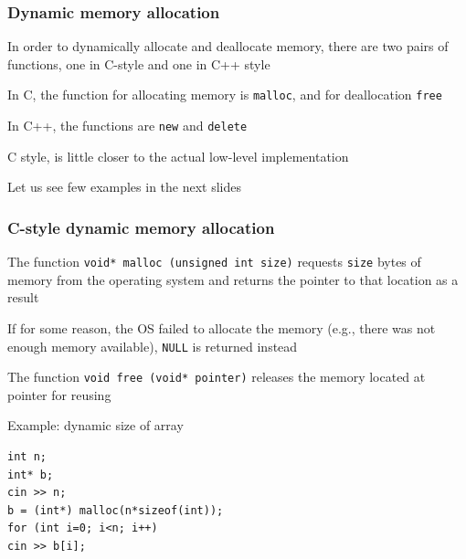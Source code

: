 \documentclass{beamer}
\begin{document}
\begin{frame}[fragile]
\frametitle{Dynamic memory allocation}
In order to dynamically allocate and deallocate memory, there are two pairs of functions, one in C-style and one in C++ style

\medskip

In C, the function for allocating memory is \verb|malloc|, and for deallocation \verb|free|

\medskip

In C++, the functions are \verb|new| and \verb|delete|

\medskip

C style, is little closer to the actual low-level implementation

\medskip

Let us see few examples in the next slides

\end{frame}
\begin{frame}[fragile]
\frametitle{C-style dynamic memory allocation}

The function \verb|void* malloc (unsigned int size)| requests \texttt{size} bytes of memory from the operating system and 
returns the pointer to that location as a result

\medskip

If for some reason, the OS failed to allocate the
memory (e.g., there was not enough memory available), \verb|NULL| is returned instead

\medskip

The function \verb|void free (void* pointer)| releases
 the memory located at pointer for reusing
 
\begin{block}{Example: dynamic size of array}
\begin{scriptsize}
\begin{verbatim}
int n;
int* b;
cin >> n;
b = (int*) malloc(n*sizeof(int));
for (int i=0; i<n; i++)
cin >> b[i];
\end{verbatim}
\end{scriptsize}
\end{block}

\end{frame}
\end{document}
